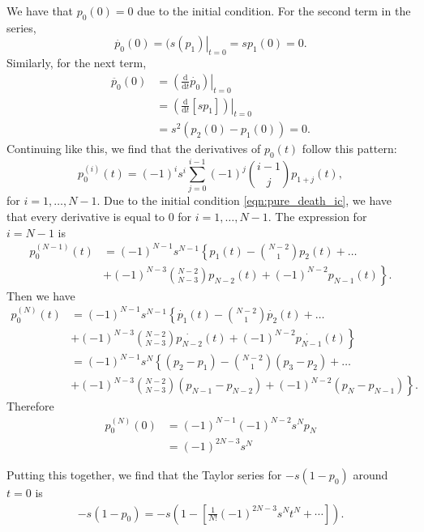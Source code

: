 \documentclass[a4paper,11pt]{article}
\numberwithin{equation}{section}
\newcommand{\diff}[2]{\frac{\mathrm{d} #1}{\mathrm{d} #2}}
\begin{document}
We have that \(p_0(0) = 0\) due to the initial condition. For the second term in
the series,
\begin{equation*}
    \dot{p_0}(0) = \left.(s(p_1)\right|_{t=0} = sp_1(0) = 0.
\end{equation*}
Similarly, for the next term,
\begin{align*}
    \ddot{p_0}(0) &= \left.\left(\diff{}{t}\dot{p_0}\right)\right|_{t=0}\\
    &= \left.\left(\diff{}{t}\left[s p_1\right]\right)\right|_{t=0}\\
    &= s^2\left(p_2(0) - p_1(0)\right) = 0.
\end{align*}
Continuing like this, we find that the derivatives of \(p_0(t)\) follow this
pattern:
\begin{equation*}
    p_0^{(i)}(t) = (-1)^i s^i \sum_{j=0}^{i-1}(-1)^j
    \binom{i-1}{j} p_{1+j}(t),
\end{equation*}
for \(i=1,\dotsc,N-1\).
Due to the initial condition \eqref{eqn:pure_death_ic}, we have that every
derivative is equal to \(0\) for \(i=1,\dotsc,N-1\). The expression for
\(i=N-1\) is
\begin{align*}
    p_0^{(N-1)}(t) &= (-1)^{N-1} s^{N-1} \left\{ p_1(t) - \binom{N-2}{1}p_2(t) +
    \dotsc \right.\\
    &\left.+ (-1)^{N-3} \binom{N-2}{N-3} p_{N-2}(t) +
    (-1)^{N-2}p_{N-1}(t)\right\}.
\end{align*}
Then we have
\begin{align*}
    p_0^{(N)}(t) &= (-1)^{N-1} s^{N-1} \left\{ \dot{p_1}(t) -
    \binom{N-2}{1}\dot{p_2}(t) +
    \dotsc \right.\\
    &\left.+ (-1)^{N-3} \binom{N-2}{N-3} \dot{p_{N-2}}(t) +
    (-1)^{N-2}\dot{p_{N-1}}(t)\right\}\\
    &= (-1)^{N-1} s^{N} \left\{ (p_2-p_1) -
    \binom{N-2}{1}(p_3-p_2) +
    \dotsc \right.\\
    &\left.+ (-1)^{N-3} \binom{N-2}{N-3} (p_{N-1} - p_{N-2}) +
    (-1)^{N-2} (p_N - p_{N-1})\right\}.
\end{align*}
Therefore
\begin{align*}
    p_0^{(N)}(0) &= (-1)^{N-1} (-1)^{N-2} s^N p_N\\
    &= (-1)^{2N-3} s^N
\end{align*}

Putting this together, we find that the Taylor series for \(-s(1-p_0)\) around
\(t=0\) is
\begin{align*}
    -s(1-p_0) = -s\left(1 - \left[ \frac{1}{N!}(-1)^{2N-3}s^N t^N + \dotsb
    \right] \right).
\end{align*}
\end{document}
